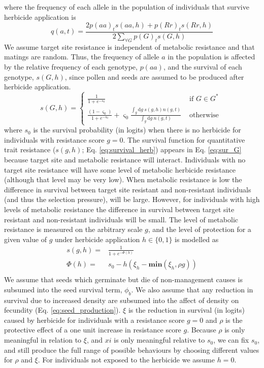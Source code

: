 \documentclass[12pt, a4paper]{article}
\begin{document}
where the frequency of each allele in the population of individuals that survive herbicide application is       
\begin{equation}\label{eq:allele_freq}
	q(a, t) = \frac{2p(aa)_t s(aa, h) + p(Rr)_t s(Rr, h)}{2\sum_{\forall G}p(G)_ts(G, h)}
\end{equation}
We assume target site resistance is independent of metabolic resistance and that matings are random. Thus, the frequency of allele $a$ in the population is affected by the relative frequency of each genotype, $p(aa)$, and the survival of each genotype, $s(G, h)$, since pollen and seeds are assumed to be produced after herbicide application. 
\begin{equation}\label{eq:sur_G}
	s(G, h) = \begin{cases} 
		\frac{1}{1 + e^{-s_0}} &\text{~if~} G \in G^* \\
		\frac{(1 - \varsigma_0)}{1 + e^{-s_0}} + \varsigma_0 \frac{\int_g \text{d}g~s(g, h) n(g, t)}{\int_g \text{d}g~n(g, t)} &\text{~otherwise~} 		
	\end{cases} 
\end{equation}
where $s_0$ is the survival probability (in logits) when there is no herbicide for individuals with resistance score $g = 0$. The survival function for quantitative trait resistance ($s(g, h)$; Eq. \ref{eq:survival_herb}) appears in Eq. \ref{eq:sur_G} because target site and metabolic resistance will interact. Individuals with no target site resistance will have some level of metabolic herbicide resistance (although that level may be very low). When metabolic resistance is low the difference in survival between target site resistant and non-resistant individuals (and thus the selection pressure), will be large. However, for individuals with high levels of metabolic resistance the difference in survival between target site resistant and non-resistant individuals will be small. The level of metabolic resistance is measured on the arbitrary scale $g$, and the level of protection for a given value of $g$ under herbicide application $h \in \{0, 1\}$ is modelled as 
\begin{align}\label{eq:survival_herb}
	s(g, h) =& \frac{1}{1 + e^{-\Phi(h)}}\\
	\Phi(h) =& s_0 - h\left(\xi_h - \textbf{min}(\xi_h, \rho g) \right)\\
\end{align}
We assume that seeds which germinate but die of non-management causes is subsumed into the seed survival term, $\phi_b$. We also assume that any reduction in survival due to increased density are subsumed into the affect of density on fecundity (Eq. \ref{eq:seed_production}). $\xi$ is the reduction in survival (in logits) caused by herbicide for individuals with a resistance score $g = 0$ and $\rho$ is the protective effect of a one unit increase in resistance score $g$. Because $\rho$ is only meaningful in relation to $\xi$, and $xi$ is only meaningful relative to $s_0$, we can fix $s_0$, and still produce the full range of possible behaviours by choosing different values for $\rho$ and $\xi$. For individuals not exposed to the herbicide we assume $h = 0$.
\end{document}
